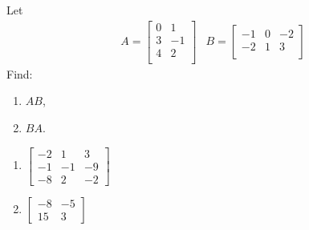 \begin{Exercise}
Let 
\begin{align*}
& A =
\begin{bmatrix}
0 & 1 \\
3 & -1 \\
4 & 2 \\
\end{bmatrix}
& B =
\begin{bmatrix}
-1 & 0 & -2 \\
-2 & 1 & 3 \\
\end{bmatrix}
\end{align*}
Find:
\begin{enumerate}[label=(\alph*)]
\item $AB$,
\item $BA$.
\end{enumerate}
\end{Exercise}
\begin{Answer}
\begin{enumerate}[label=(\alph*)]
\item $\begin{bmatrix}
-2 & 1 & 3 \\
-1 & -1 & -9 \\
-8 & 2 & -2 \end{bmatrix}$
\item $\begin{bmatrix}
-8 & -5 \\
15 & 3
\end{bmatrix}$
\end{enumerate}
\end{Answer}

